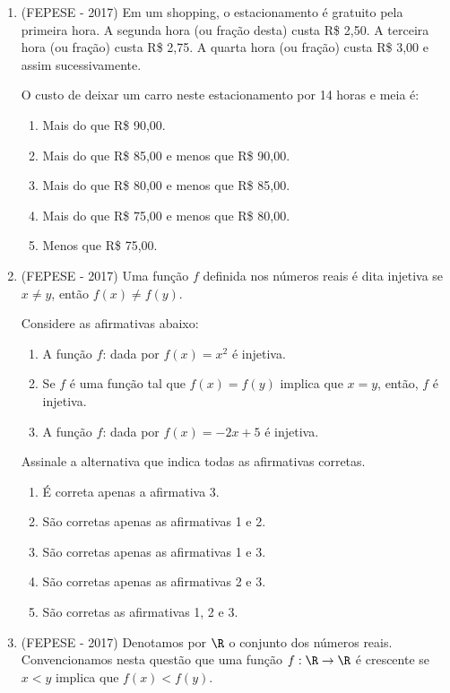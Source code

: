 \begin{enumerate}
 \item (FEPESE - 2017) Em um shopping, o estacionamento é gratuito pela primeira hora. A segunda hora (ou fração desta) custa R\$ 2,50. A terceira hora (ou fração) custa R\$ 2,75. A quarta hora (ou fração) custa R\$ 3,00 e assim sucessivamente.

 O custo de deixar um carro neste estacionamento por 14 horas e meia é:
 \begin{enumerate}
  \item Mais do que R\$ 90,00.
  \item Mais do que R\$ 85,00 e menos que R\$ 90,00.
  \item Mais do que R\$ 80,00 e menos que R\$ 85,00.
  \item Mais do que R\$ 75,00 e menos que R\$ 80,00.
  \item Menos que R\$ 75,00.
 \end{enumerate}
 
 \item (FEPESE - 2017) Uma função $f$ definida nos números reais é dita injetiva se $x \neq y$, então $f(x) \neq f(y)$.

Considere as afirmativas abaixo:
\begin{enumerate}[1.]
 \item A função $f$:  dada por $f(x) = x^2$ é injetiva.

 \item Se $f$ é uma função tal que $f(x) = f(y)$ implica que $x = y$, então, $f$ é injetiva.

 \item A função $f$:  dada por $f(x) = -2x + 5$ é injetiva.
 \end{enumerate}
 Assinale a alternativa que indica todas as afirmativas corretas.
 \begin{enumerate}
 \item É correta apenas a afirmativa 3. 
 \item São corretas apenas as afirmativas 1 e 2.
 \item São corretas apenas as afirmativas 1 e 3.
 \item São corretas apenas as afirmativas 2 e 3.
 \item São corretas as afirmativas 1, 2 e 3.
 \end{enumerate}
 
 \item (FEPESE - 2017) Denotamos por $\R$ o conjunto dos números reais. Convencionamos nesta questão que uma função $f : \R \rightarrow \R$ é crescente se $x < y$ implica que $f(x) < f(y)$.


\end{enumerate}
